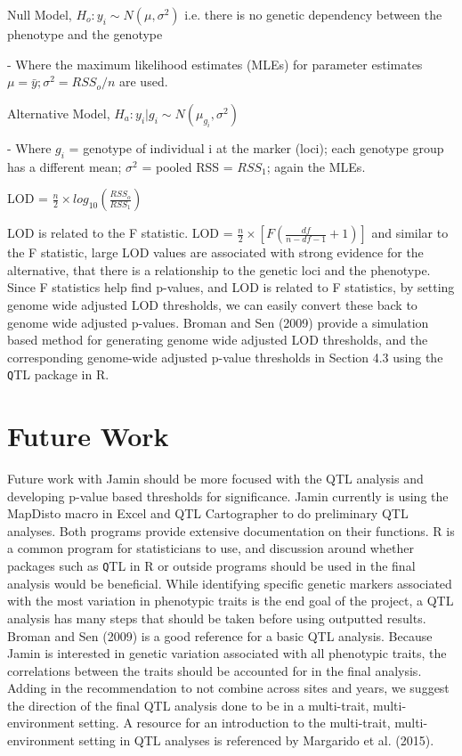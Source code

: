\documentclass[11pt]{article}\usepackage[]{graphicx}\usepackage[]{color}
\begin{document}
Null Model, $H_{o}: y_{i} \sim N(\mu, \sigma^2)$ i.e. there is no genetic dependency between the phenotype and the genotype

- Where the maximum likelihood estimates (MLEs) for parameter estimates $\mu = \bar{y}; \sigma^2 = RSS_{o}/n$ are used.

Alternative Model, $H_{a}: y_{i}|g_{i} \sim N(\mu_{g_{i}}, \sigma^2)$

- Where $g_{i}$ = genotype of individual i at the marker (loci); each genotype group has a different mean; $\sigma^2$ = pooled RSS = $RSS_{1}$; again the MLEs. 

LOD = $\frac{n}{2} \times log_{10}(\frac{RSS_{o}}{RSS_{1}})$

LOD is related to the F statistic. LOD = $\frac{n}{2} \times [F(\frac{df}{n-df-1} + 1)]$ and similar to the F statistic, large LOD values are associated with strong evidence for the alternative, that there is a relationship to the genetic loci and the phenotype. Since F statistics help find p-values, and LOD is related to F statistics, by setting genome wide adjusted LOD thresholds, we can easily convert these back to genome wide adjusted p-values. Broman and Sen (2009) provide a simulation based method for generating genome wide adjusted LOD thresholds, and the corresponding genome-wide adjusted p-value thresholds in Section 4.3 using the {\texttt QTL} package in R. 

\section{Future Work}

Future work with Jamin should be more focused with the QTL analysis and developing p-value based thresholds for significance. Jamin currently is using the MapDisto macro in Excel and QTL Cartographer to do preliminary QTL analyses. Both programs provide extensive documentation on their functions. R is a common program for statisticians to use, and discussion around whether packages such as {\texttt QTL} in R or outside programs should be used in the final analysis would be beneficial. While identifying specific genetic markers associated with the most variation in phenotypic traits is the end goal of the project, a QTL analysis has many steps that should be taken before using outputted results. Broman and Sen (2009) is a good reference for a basic QTL analysis. Because Jamin is interested in genetic variation associated with all phenotypic traits, the correlations between the traits should be accounted for in the final analysis. Adding in the recommendation to not combine across sites and years, we suggest the direction of the final QTL analysis done to be in a multi-trait, multi-environment setting. A resource for an introduction to the multi-trait, multi-environment setting in QTL analyses is referenced by Margarido et al. (2015).
\end{document}
